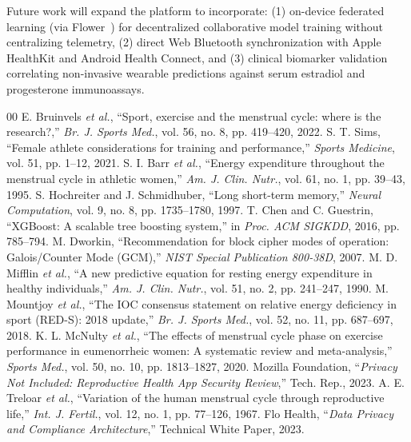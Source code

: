 \documentclass[conference]{IEEEtran}
\begin{document}
Future work will expand the platform to incorporate: (1) on-device federated learning (via Flower~\cite{beutel2020}) for decentralized collaborative model training without centralizing telemetry, (2) direct Web Bluetooth synchronization with Apple HealthKit and Android Health Connect, and (3) clinical biomarker validation correlating non-invasive wearable predictions against serum estradiol and progesterone immunoassays.

\begin{thebibliography}{00}
 E. Bruinvels \textit{et al.}, ``Sport, exercise and the menstrual cycle: where is the research?,'' \textit{Br. J. Sports Med.}, vol. 56, no. 8, pp. 419--420, 2022.
 S. T. Sims, ``Female athlete considerations for training and performance,'' \textit{Sports Medicine}, vol. 51, pp. 1--12, 2021.
 S. I. Barr \textit{et al.}, ``Energy expenditure throughout the menstrual cycle in athletic women,'' \textit{Am. J. Clin. Nutr.}, vol. 61, no. 1, pp. 39--43, 1995.
 S. Hochreiter and J. Schmidhuber, ``Long short-term memory,'' \textit{Neural Computation}, vol. 9, no. 8, pp. 1735--1780, 1997.
 T. Chen and C. Guestrin, ``XGBoost: A scalable tree boosting system,'' in \textit{Proc. ACM SIGKDD}, 2016, pp. 785--794.
 M. Dworkin, ``Recommendation for block cipher modes of operation: Galois/Counter Mode (GCM),'' \textit{NIST Special Publication 800-38D}, 2007.
 M. D. Mifflin \textit{et al.}, ``A new predictive equation for resting energy expenditure in healthy individuals,'' \textit{Am. J. Clin. Nutr.}, vol. 51, no. 2, pp. 241--247, 1990.
 M. Mountjoy \textit{et al.}, ``The IOC consensus statement on relative energy deficiency in sport (RED-S): 2018 update,'' \textit{Br. J. Sports Med.}, vol. 52, no. 11, pp. 687--697, 2018.
 K. L. McNulty \textit{et al.}, ``The effects of menstrual cycle phase on exercise performance in eumenorrheic women: A systematic review and meta-analysis,'' \textit{Sports Med.}, vol. 50, no. 10, pp. 1813--1827, 2020.
 Mozilla Foundation, ``\textit{Privacy Not Included: Reproductive Health App Security Review},'' Tech. Rep., 2023.
 A. E. Treloar \textit{et al.}, ``Variation of the human menstrual cycle through reproductive life,'' \textit{Int. J. Fertil.}, vol. 12, no. 1, pp. 77--126, 1967.
 Flo Health, ``\textit{Data Privacy and Compliance Architecture},'' Technical White Paper, 2023.

\end{thebibliography}
\end{document}

